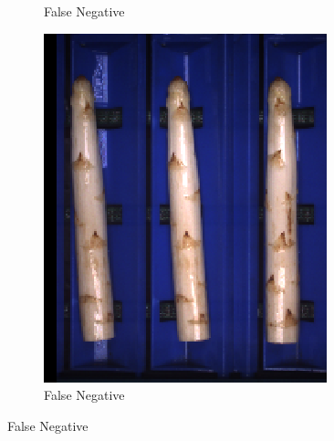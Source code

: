 \begin{figure}[h]
\begin{subfigure}{0.3\textwidth}
		\vspace{-5pt}
		\caption{False Negative}
	\end{subfigure}
	\begin{subfigure}{0.3\textwidth}
		\includegraphics[width=0.9\linewidth]{Figures/appendix/flower_falsenegative_03.png}
		\vspace{-5pt}
		\caption{False Negative}
	\end{subfigure}


\end{figure}
